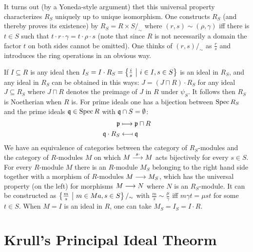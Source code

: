 \documentclass[a4paper,parskip=full,numbers=enddot]{scrreprt}
\begin{document}
    It turns out (by a Yoneda-style argument) thet this universal property characterizes $R_S$ uniquely up to unique isomorphism. One constructs $R_S$ (and thereby proves its existence) by $R_S = R\times S/_\sim$ where $(r,s)\sim (\rho, \gamma)$ iff there is $t\in S$ such that $t\cdot r\cdot \gamma = t\cdot\rho\cdot s$ (note that since $R$ is not necessarily a domain the factor $t$ on both sides cannot be omitted). One thinks of $(r,s)/_\sim$ as $\frac{r}{s}$ and introduces the ring operations in an obvious way. 
    
    If $I\subseteq R$ is any ideal then $I_S = I\cdot R_S = \left\{\frac{i}{s}\st i\in I, s\in S\right\}$ is an ideal in $R_S$, and any ideal in $R_S$ can be obtained in this ways: $J= (J\sqcap R)\cdot R_S$ for any ideal $J\subseteq R_S$ where $J\sqcap R$ denotes the preimage of $J$ in $R$ under $\psi_S$. It follows then $R_S$ is Noetherian when $R$ is. For prime ideals one has a bijection between $\Spec R_S$ and the prime ideals $\qq\in \Spec R$ with $\qq\cap S = \emptyset$:
    \begin{align*}
        \pp &\longmapsto \pp\sqcap R\\
        \qq\cdot R_S &\longmapsfrom \qq    
    \end{align*}
    We have an equivalence of categories between the category of $R_S$-modules and the category of $R$-modules $M$ on which $M \morphism[s\cdot] M$ acts bijectively for every $s\in S$. For every $R$-module $M$ there is an $R$-module $M_S$ belonging to the right hand side together with a morphism of $R$-modules $M\morphism M_S$, which has the universal property (on the left) for morphisms $M\morphism N$ where $N$ is an $R_S$-module. It can be constructed as $\left\{\frac{m}{s}\st m \in M a, s\in S\right\}/_\sim$ with $\frac{m}{s}\sim \frac{\mu}{\gamma}$ iff $m\gamma t = \mu s t$ for some $t\in S$. When $M=I$ is an ideal in $R$, one can take $M_S = I_S = I\cdot R$.



\chapter{Krull's Principal Ideal Theorm}
\end{document}
